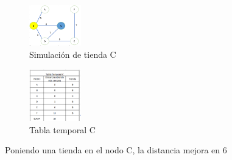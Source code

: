 \documentclass[conference,compsoc]{IEEEtran}
\begin{document}
\begin{figure}[h]
    \centering
    \includegraphics[width=0.20\textwidth]{Problema1/p7.png}
    \caption{ Simulación de tienda C }
    \label{fig:mesh1}
\end{figure}
\begin{figure}[h]
    \centering
    \includegraphics[width=0.20\textwidth]{Problema1/p8.png}
    \caption{Tabla temporal C}
    \label{fig:mesh1}
\end{figure}
$$$$$$$$$$$$$$$$
Poniendo una tienda en el nodo C, la distancia mejora en 6
\end{document}
